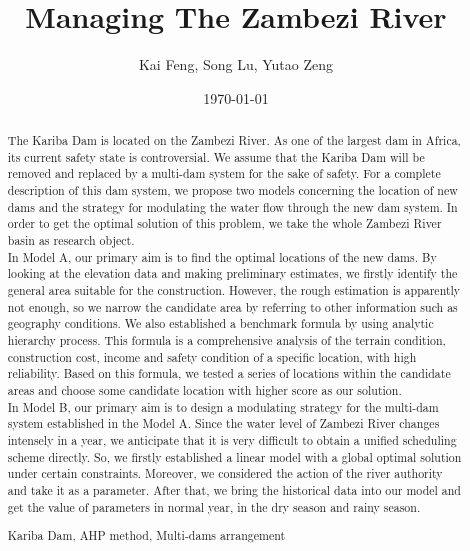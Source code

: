 \documentclass{mcmthesis}
\title{Managing The Zambezi River}
\author{Kai Feng, Song Lu, Yutao Zeng}
\date{\today}
\begin{document}
\begin{abstract}
The Kariba Dam is located on the Zambezi River. As one of the largest dam in Africa, its current safety state is controversial. We assume that the Kariba Dam will be removed and replaced by a multi-dam system for the sake of safety. For a complete description of this dam system, we propose two models concerning the location of new dams and the strategy for modulating the water flow through the new dam system. In order to get the optimal solution of this problem, we take the whole Zambezi River basin as research object.\\
\indent In Model A, our primary aim is to find the optimal locations of the new dams. By looking at the elevation data and making preliminary estimates, we firstly identify the general area suitable for the construction. However, the rough estimation is apparently not enough, so we narrow the candidate area by referring to other information such as geography conditions. We also established a benchmark formula by using analytic hierarchy process. This formula is a comprehensive analysis of the terrain condition, construction cost, income and safety condition of a specific location, with high reliability. Based on this formula, we tested a series of locations within the candidate areas and choose some candidate location with higher score as our solution.\\
\indent In Model B, our primary aim is to design a modulating strategy for the multi-dam system established in the Model A. Since the water level of Zambezi River changes intensely in a year, we anticipate that it is very difficult to obtain a unified scheduling scheme directly. So, we firstly established a linear model with a global optimal solution under certain constraints. Moreover, we considered the action of the river authority and take it as a parameter. After that, we bring the historical data into our model and get the value of parameters in normal year, in the dry season and rainy season.
\begin{keywords}
Kariba Dam, AHP method, Multi-dams arrangement
\end{keywords}
\end{abstract}
\maketitle
\end{document}
